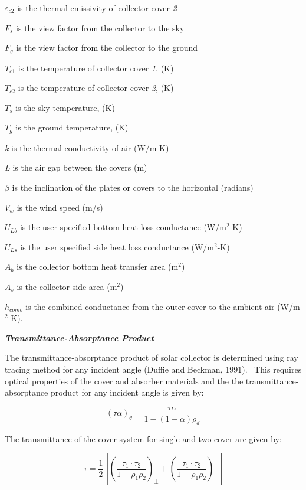 \({\varepsilon}_{c2}\) is the thermal emissivity of collector cover \emph{2}

\(F_{s}\) is the view factor from the collector to the sky

\(F_{g}\) is the view factor from the collector to the ground

\(T_{c1}\) is the temperature of collector cover \emph{1}, (K)

\(T_{c2}\) is the temperature of collector cover \emph{2}, (K)

\(T_{s}\) is the sky temperature, (K)

\(T_{g}\) is the ground temperature, (K)

\emph{k} is the thermal conductivity of air (W/m K)

\emph{L} is the air gap between the covers (m)

\(\beta\) is the inclination of the plates or covers to the horizontal (radians)

\(V_{w}\) is the wind speed (m/s)

\(U_{Lb}\) is the user specified bottom heat loss conductance (W/m\(^{2}\)-K)

\(U_{Ls}\) is the user specified side heat loss conductance (W/m\(^{2}\)-K)

\(A_{b}\) is the collector bottom heat transfer area (m\(^{2}\))

\(A_{s}\) is the collector side area (m\(^{2}\))

\(h_{comb}\) is the combined conductance from the outer cover to the ambient air (W/m\(^{2}\)-K).

\textbf{\emph{Transmittance-Absorptance Product}}

The transmittance-absorptance product of solar collector is determined using ray tracing method for any incident angle (Duffie and Beckman, 1991).~ This requires optical properties of the cover and absorber materials and the the transmittance-absorptance product for any incident angle is given by:

\begin{equation}
{\left( {\tau \alpha } \right)_\theta } = \frac{{\tau \alpha }}{{1 - \left( {1 - \alpha } \right){\rho_d}}}
\end{equation}

The transmittance of the cover system for single and two cover are given by:

\begin{equation}
\tau  = \frac{1}{2}\left[ {{{\left( {\frac{{{\tau_1} \cdot {\tau_2}}}{{1 - {\rho_1}{\rho_2}}}} \right)}_ \bot } + {{\left( {\frac{{{\tau_1} \cdot {\tau_2}}}{{1 - {\rho_1}{\rho_2}}}} \right)}_\parallel }} \right]
\end{equation}

